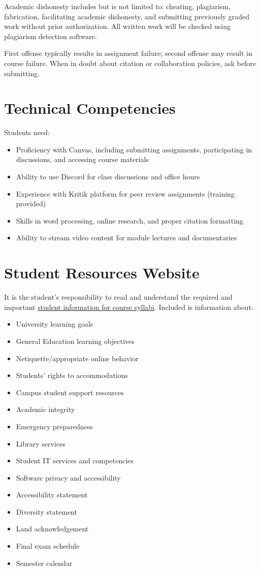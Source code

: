 \documentclass[12pt]{article}     %
\begin{document}
Academic dishonesty includes but is not limited to: cheating, plagiarism, fabrication, facilitating academic dishonesty, and submitting previously graded work without prior authorization. All written work will be checked using plagiarism detection software. 

First offense typically results in assignment failure; second offense may result in course failure. When in doubt about citation or collaboration policies, ask before submitting.

\section*{Technical Competencies}
Students need:
\begin{itemize}
\item Proficiency with Canvas, including submitting assignments, participating in discussions, and accessing course materials
\item Ability to use Discord for class discussions and office hours
\item Experience with Kritik platform for peer review assignments (training provided)
\item Skills in word processing, online research, and proper citation formatting
\item Ability to stream video content for module lectures and documentaries
\end{itemize}

\section*{Student Resources Website}
It is the student's responsibility to read and understand the required and important \href{https://fdc.fullerton.edu/teaching/student-info-syllabi.html}{student information for course syllabi}. Included is information about:

\begin{itemize}
\item University learning goals
\item General Education learning objectives
\item Netiquette/appropriate online behavior
\item Students' rights to accommodations
\item Campus student support resources
\item Academic integrity
\item Emergency preparedness
\item Library services
\item Student IT services and competencies
\item Software privacy and accessibility
\item Accessibility statement
\item Diversity statement
\item Land acknowledgement
\item Final exam schedule
\item Semester calendar
\end{itemize}
\end{document}
